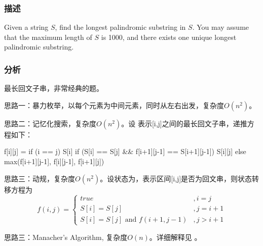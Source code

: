 \subsubsection{描述}
Given a string $S$, find the longest palindromic substring in $S$. You may assume that the maximum length of $S$ is 1000, and there exists one unique longest palindromic substring.


\subsubsection{分析}
最长回文子串，非常经典的题。

思路一：暴力枚举，以每个元素为中间元素，同时从左右出发，复杂度$O(n^2)$。

思路二：记忆化搜索，复杂度$O(n^2)$。设 表示[i,j]之间的最长回文子串，递推方程如下：
\begin{Code}
f[i][j] = if (i == j) S[i]
          if (S[i] == S[j] && f[i+1][j-1] == S[i+1][j-1]) S[i][j]
          else max(f[i+1][j-1], f[i][j-1], f[i+1][j])
\end{Code}

思路三：动规，复杂度$O(n^2)$。设状态为，表示区间[i,j]是否为回文串，则状态转移方程为
$$
f(i,j)=\begin{cases}
true & ,i=j\\
S[i]=S[j] & , j = i + 1 \\
S[i]=S[j] \text{ and } f(i+1, j-1) & , j > i + 1
\end{cases}
$$

思路三：Manacher’s Algorithm, 复杂度$O(n)$。详细解释见  。


